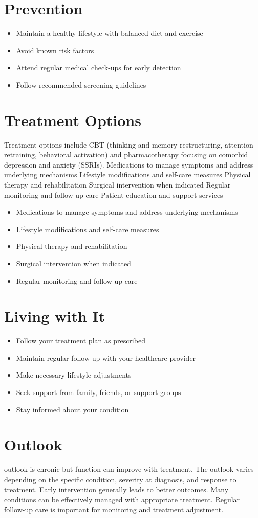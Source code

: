 \section{Prevention}
\begin{itemize}[noitemsep]
  \item Maintain a healthy lifestyle with balanced diet and exercise
  \item Avoid known risk factors
  \item Attend regular medical check-ups for early detection
  \item Follow recommended screening guidelines
\end{itemize}
\section{Treatment Options}
Treatment options include CBT (thinking and memory restructuring, attention retraining, behavioral activation) and pharmacotherapy focusing on comorbid depression and anxiety (SSRIs). Medications to manage symptoms and address underlying mechanisms Lifestyle modifications and self-care measures Physical therapy and rehabilitation Surgical intervention when indicated Regular monitoring and follow-up care Patient education and support services

\begin{itemize}[noitemsep]
  \item Medications to manage symptoms and address underlying mechanisms
  \item Lifestyle modifications and self-care measures
  \item Physical therapy and rehabilitation
  \item Surgical intervention when indicated
  \item Regular monitoring and follow-up care
\end{itemize}
\section{Living with It}
\begin{itemize}[noitemsep]
  \item Follow your treatment plan as prescribed
  \item Maintain regular follow-up with your healthcare provider
  \item Make necessary lifestyle adjustments
  \item Seek support from family, friends, or support groups
  \item Stay informed about your condition
\end{itemize}
\section{Outlook}
outlook is chronic but function can improve with treatment. The outlook varies depending on the specific condition, severity at diagnosis, and response to treatment. Early intervention generally leads to better outcomes. Many conditions can be effectively managed with appropriate treatment. Regular follow-up care is important for monitoring and treatment adjustment.
